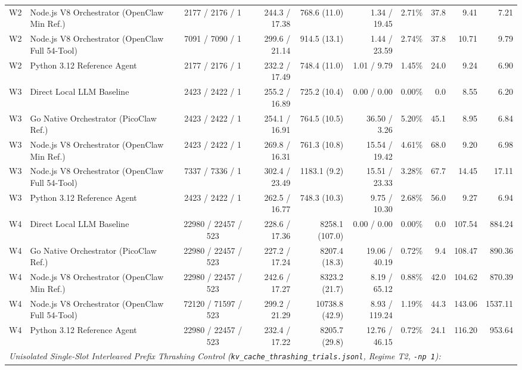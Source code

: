 \begin{table}[t]
\begin{tabular}{l l c r r r r r r r}
W2 & Node.js V8 Orchestrator (OpenClaw Min Ref.) & 2177 / 2176 / 1 & 244.3 / 17.38 & 768.6 (11.0) & 1.34 / 19.45 & 2.71\% & 37.8 & 9.41 & 7.21 \\
W2 & Node.js V8 Orchestrator (OpenClaw Full 54-Tool) & 7091 / 7090 / 1 & 299.6 / 21.14 & 914.5 (13.1) & 1.44 / 23.59 & 2.74\% & 37.8 & 10.71 & 9.79 \\
W2 & Python 3.12 Reference Agent & 2177 / 2176 / 1 & 232.2 / 17.49 & 748.4 (11.0) & 1.01 / 9.79 & 1.45\% & 24.0 & 9.24 & 6.90 \\
\hline
W3 & Direct Local LLM Baseline & 2423 / 2422 / 1 & 255.2 / 16.89 & 725.2 (10.4) & 0.00 / 0.00 & 0.00\% & 0.0 & 8.55 & 6.20 \\
W3 & Go Native Orchestrator (PicoClaw Ref.) & 2423 / 2422 / 1 & 254.1 / 16.91 & 764.5 (10.5) & 36.50 / 3.26 & 5.20\% & 45.1 & 8.95 & 6.84 \\
W3 & Node.js V8 Orchestrator (OpenClaw Min Ref.) & 2423 / 2422 / 1 & 269.8 / 16.31 & 761.3 (10.8) & 15.54 / 19.42 & 4.61\% & 68.0 & 9.20 & 6.98 \\
W3 & Node.js V8 Orchestrator (OpenClaw Full 54-Tool) & 7337 / 7336 / 1 & 302.4 / 23.49 & 1183.1 (9.2) & 15.51 / 23.33 & 3.28\% & 67.7 & 14.45 & 17.11 \\
W3 & Python 3.12 Reference Agent & 2423 / 2422 / 1 & 262.5 / 16.77 & 748.3 (10.3) & 9.75 / 10.30 & 2.68\% & 56.0 & 9.27 & 6.94 \\
\hline
W4 & Direct Local LLM Baseline & 22980 / 22457 / 523 & 228.6 / 17.36 & 8258.1 (107.0) & 0.00 / 0.00 & 0.00\% & 0.0 & 107.54 & 884.24 \\
W4 & Go Native Orchestrator (PicoClaw Ref.) & 22980 / 22457 / 523 & 227.2 / 17.24 & 8207.4 (18.3) & 19.06 / 40.19 & 0.72\% & 9.4 & 108.47 & 890.36 \\
W4 & Node.js V8 Orchestrator (OpenClaw Min Ref.) & 22980 / 22457 / 523 & 242.6 / 17.27 & 8323.2 (21.7) & 8.19 / 65.12 & 0.88\% & 42.0 & 104.62 & 870.39 \\
W4 & Node.js V8 Orchestrator (OpenClaw Full 54-Tool) & 72120 / 71597 / 523 & 299.2 / 21.29 & 10738.8 (42.9) & 8.93 / 119.24 & 1.19\% & 44.3 & 143.06 & 1537.11 \\
W4 & Python 3.12 Reference Agent & 22980 / 22457 / 523 & 232.4 / 17.22 & 8205.7 (29.8) & 12.76 / 46.15 & 0.72\% & 24.1 & 116.20 & 953.64 \\
\hline
\multicolumn{10}{l}{\textit{Unisolated Single-Slot Interleaved Prefix Thrashing Control (\texttt{kv\_cache\_thrashing\_trials.jsonl}, Regime T2, \texttt{-np 1}):}} \\

\end{tabular}
\end{table}
